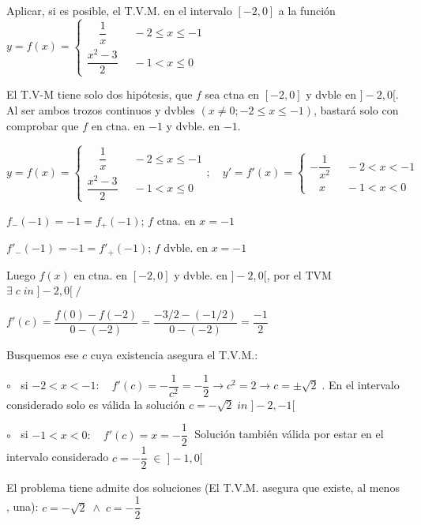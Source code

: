 	
	\begin{ejre} Aplicar, si es posible, el T.V.M. en el intervalo $[-2,0]$ a la función $y=f(x)=\begin{cases}
		\; \; \; \; \dfrac 1 x \; & \; -2\le x \le -1\\
		\dfrac {x^2-3}{2} \; & \; -1 < x \le 0
		\end{cases}	$
		
	\end{ejre}
	\begin{proofw}\renewcommand{\qedsymbol}{$\diamond$}	
		
		El T.V-M tiene solo dos hipótesis, que $f$ sea ctna en $[-2,0]$ y dvble en $]-2,0[$. Al ser ambos trozos continuos y dvbles $(x\neq 0; -2\le x\le-1)$, bastará solo con comprobar que $f$ en ctna. en $-1$ y dvble. en $-1$.
		
		$y=f(x)=\begin{cases}
		\; \; \; \; \dfrac 1 x \; & \; -2\le x \le -1\\
		\dfrac {x^2-3}{2} \; & \; -1 < x \le 0
		\end{cases}; \quad y'=f'(x)=\begin{cases}
		 -\dfrac 1 {x^2} \; & \; -2< x < -1\\
		\; \; \; x \; & \; -1 < x < 0
		\end{cases}	$	
		
		$f_-(-1)=-1=f_+(-1)$; $f$ ctna. en $x=-1$
		
		$f'_-(-1)=-1=f'_+(-1)$; $f$ dvble. en $x=-1$
		
		Luego $f(x)$ en ctna. en $[-2,0]$ y dvble. en $]-2,0[$, por el TVM $\exists \; c\; in\; ]-2,0[ \; / \; $
		
		$f'(c)=\dfrac {f(0)-f(-2)}{0-(-2)}= \dfrac {-3/2 - (-1/2)}{0-(-2)}= \dfrac {-1}{2}$
		
		Busquemos ese $c$ cuya existencia asegura el T.V.M.:
		
		$\circ\; \; $ si $-2<x<-1: \quad f'(c)=-\dfrac{1}{c^2}=-\dfrac 1 2 \to c^2=2 \to c=\pm\sqrt{2} \; $. En el intervalo considerado solo es válida la solución $c=-\sqrt{2} \; in \; ]-2,-1[$
		
		$\circ\; \; $ si $-1<x<0: \quad f'(c)=x=-\dfrac 1 2\; $ Solución también válida por estar en el intervalo considerado $c=-\dfrac 1 2 \; \in \; ]-1,0[$
		
		El problema tiene admite dos soluciones (El T.V.M. asegura que existe, al menos , una): $c=-\sqrt{2} \; \wedge \; c=-\dfrac 1 2$
		
	\end{proofw}


